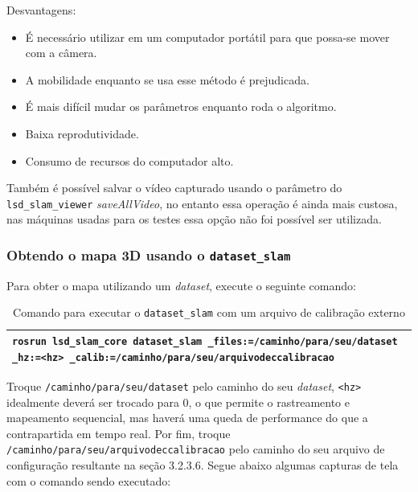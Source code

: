Desvantagens:

\begin{itemize}
	\item{É necessário utilizar em um computador portátil para que possa-se mover com a câmera.}
	\item{A mobilidade enquanto se usa esse método é prejudicada.}
	\item{É mais difícil mudar os parâmetros enquanto roda o algoritmo.}
	\item{Baixa reprodutividade.}
	\item{Consumo de recursos do computador alto.}
\end{itemize}	

Também é possível salvar o vídeo capturado usando o parâmetro do \texttt{lsd\_slam\_viewer} \textit{saveAllVideo}, no entanto essa operação é ainda mais custosa, nas máquinas usadas para os testes essa opção não foi possível ser utilizada.

\subsubsection{Obtendo o mapa 3D usando o \texttt{dataset\_slam}}

Para obter o mapa utilizando um \textit{dataset}, execute o seguinte comando:

\begin{table}[!ht]\label{tb:16}
\begin{tabular}{| p{\textwidth}|}
\hline
\texttt{rosrun lsd\_slam\_core dataset\_slam \_files:=/caminho/para/seu/dataset \_hz:=<hz> \_calib:=/caminho/para/seu/arquivodeccalibracao}\\
\hline
\end{tabular}
\caption{Comando para executar o \texttt{dataset\_slam} com um arquivo de calibração externo}
\end{table}

Troque \texttt{/caminho/para/seu/dataset} pelo caminho do seu \textit{dataset}, \texttt{<hz>} idealmente deverá ser trocado para 0, o que permite o rastreamento e mapeamento sequencial, mas haverá uma queda de performance do que a contrapartida em tempo real. Por fim, troque \texttt{/caminho/para/seu/arquivodeccalibracao} pelo caminho do seu arquivo de configuração resultante na seção 3.2.3.6. Segue abaixo algumas capturas de tela com o comando sendo executado:

